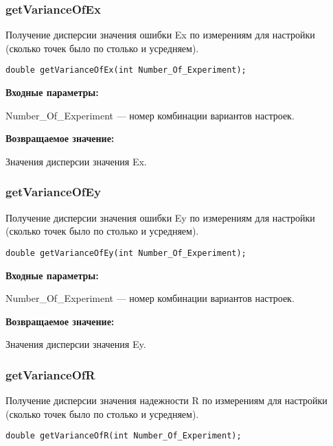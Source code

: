 \subsubsection{getVarianceOfEx}\label{getVarianceOfEx}

Получение дисперсии значения ошибки Ex по измерениям для настройки (сколько точек было по столько и усредняем).


\begin{lstlisting}[label=code_syntax_getVarianceOfEx,caption=Синтаксис]
double getVarianceOfEx(int Number_Of_Experiment);
\end{lstlisting}

\textbf{Входные параметры:}

Number\_Of\_Experiment --- номер комбинации вариантов настроек.

\textbf{Возвращаемое значение:}

Значения дисперсии значения Ex.


\subsubsection{getVarianceOfEy}\label{getVarianceOfEy}

Получение дисперсии значения ошибки Ey по измерениям для настройки (сколько точек было по столько и усредняем).


\begin{lstlisting}[label=code_syntax_getVarianceOfEy,caption=Синтаксис]
double getVarianceOfEy(int Number_Of_Experiment);
\end{lstlisting}

\textbf{Входные параметры:}

Number\_Of\_Experiment --- номер комбинации вариантов настроек.

\textbf{Возвращаемое значение:}

Значения дисперсии значения Ey.


\subsubsection{getVarianceOfR}\label{getVarianceOfR}

Получение дисперсии значения надежности R по измерениям для настройки (сколько точек было по столько и усредняем).


\begin{lstlisting}[label=code_syntax_getVarianceOfR,caption=Синтаксис]
double getVarianceOfR(int Number_Of_Experiment);
\end{lstlisting}

